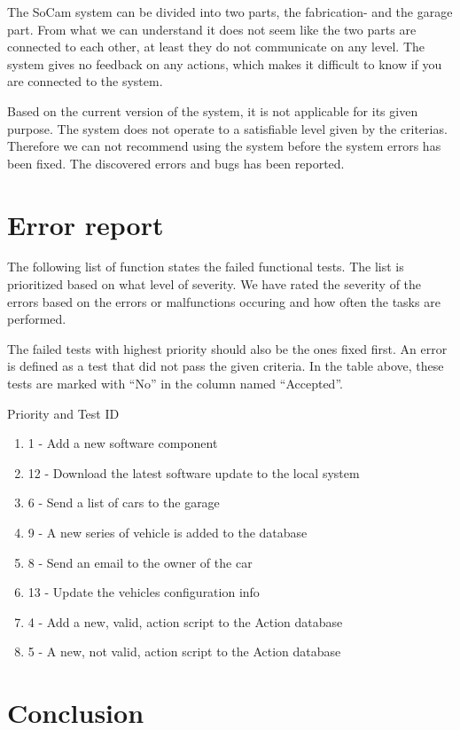 		The SoCam system can be divided into two parts, the fabrication- and the garage part. 
		From what we can understand it does not seem like the two parts are connected to each 
		other, at least they do not communicate on any level.  The system gives no feedback on 
		any actions, which makes it difficult to know if you are connected to the system. 

		Based on the current version of the system, it is not applicable for its given purpose. 
		The system does not operate to a satisfiable level given by the criterias. Therefore we 
		can not recommend using the system before the system errors has been fixed. The discovered 
		errors and bugs has been reported. 

	\clearpage
	\section{Error report}

		The following list of function states the failed functional tests. The list is prioritized 
		based on what level of severity. We have rated the severity of the errors based on the 
		errors or malfunctions occuring and how often the tasks are performed. 

		The failed tests with highest priority should also be the ones fixed first. An error is 
		defined as a test that did not pass the given criteria. In the table above, these tests 
		are marked with “No” in the column named “Accepted”. 

		Priority and Test ID
		\begin{enumerate}
			\item 1 - Add a new software component
			\item 12 - Download the latest software update to the local system
			\item 6 - Send a list of cars to the garage
			\item 9 - A new series of vehicle is added to the database
			\item 8 - Send an email to the owner of the car
			\item 13 - Update the vehicles configuration info
			\item 4 - Add a new, valid, action script to the Action database
			\item 5 - A new, not valid, action script to the Action database
			
		\end{enumerate}	


	\section{Conclusion}

